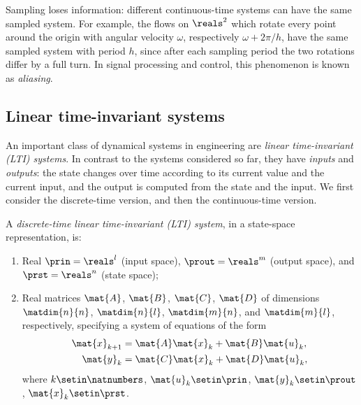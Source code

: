 Sampling loses information: different continuous-time systems can have the same sampled system.
For example, the flows on $\reals^2$ which rotate every point around the origin with angular velocity $\omega$, respectively $\omega + 2\pi/h$, have the same sampled system with period $h$, since after each sampling period the two rotations differ by a full turn.
In signal processing and control, this phenomenon is known as \emph{aliasing}.

\subsection{Linear time-invariant systems}

An important class of dynamical systems in engineering are \emph{linear time-invariant (LTI) systems}.
In contrast to the systems considered so far, they have \emph{inputs} and \emph{outputs}: the state changes over time according to its current value and the current input, and the output is computed from the state and the input.
We first consider the discrete-time version, and then the continuous-time version.

\begin{definition}
    \label{def:LTI-discrete}
    A \emph{discrete-time linear time-invariant (LTI) system}, in a state-space representation, is:

    \constit
    \begin{enumerate}
        \item Real  $\prin=\reals^l$ (input space), $\prout=\reals^m$ (output space), and $\prst=\reals^n$ (state space);
        \item Real matrices $\mat{A}$, $\mat{B}$, $\mat{C}$, $\mat{D}$ of dimensions $\matdim{n}{n}$, $\matdim{n}{l}$, $\matdim{m}{n}$, and $\matdim{m}{l}$, respectively, specifying a system of equations of the form
              \begin{equation}
                  \label{eq:LTI-discrete-equations}
                  \begin{aligned}
                      \mat{x}_{k+1} & = \mat{A}\mat{x}_k + \mat{B}\mat{u}_k, \\
                      \mat{y}_k     & = \mat{C}\mat{x}_k + \mat{D}\mat{u}_k,
                  \end{aligned}
              \end{equation}
              where $k \setin \natnumbers$, $\mat{u}_k \setin \prin$, $\mat{y}_k \setin \prout$, $\mat{x}_k \setin \prst$.
    \end{enumerate}
\end{definition}

